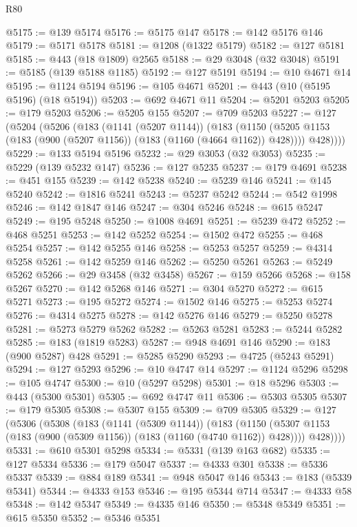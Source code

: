 \begin{lexlean}{R80}
\begin{coremodule}
@5175 := @139 @5174
@5176 := @5175 @147
@5178 := @142 @5176 @146
@5179 := @5171 @5178
@5181 := @1208 (@1322 @5179)
@5182 := @127 @5181
@5185 := @443 (@18 @1809) @2565
@5188 := @29 @3048 (@32 @3048)
@5191 := @5185 (@139 @5188 @1185)
@5192 := @127 @5191
@5194 := @10 @4671 @14
@5195 := @1124 @5194
@5196 := @105 @4671
@5201 := @443 (@10 (@5195 @5196) (@18 @5194))
@5203 := @692 @4671 @11
@5204 := @5201 @5203
@5205 := @179 @5203
@5206 := @5205 @155
@5207 := @709 @5203
@5227 := @127
    (@5204
      (@5206
        (@183
          (@1141 (@5207 @1144))
          (@183
            (@1150 (@5205 @1153 (@183 (@900 (@5207 @1156)) (@183 (@1160 (@4664 @1162)) @428))))
            @428))))
@5229 := @133 @5194 @5196
@5232 := @29 @3053 (@32 @3053)
@5235 := @5229 (@139 @5232 @147)
@5236 := @127 @5235
@5237 := @179 @4691
@5238 := @451 @155
@5239 := @142 @5238
@5240 := @5239 @146
@5241 := @145 @5240
@5242 := @1816 @5241
@5243 := @5237 @5242
@5244 := @542 @1998
@5246 := @142 @1847 @146
@5247 := @304 @5246
@5248 := @615 @5247
@5249 := @195 @5248
@5250 := @1008 @4691
@5251 := @5239 @472
@5252 := @468 @5251
@5253 := @142 @5252
@5254 := @1502 @472
@5255 := @468 @5254
@5257 := @142 @5255 @146
@5258 := @5253 @5257
@5259 := @4314 @5258
@5261 := @142 @5259 @146
@5262 := @5250 @5261
@5263 := @5249 @5262
@5266 := @29 @3458 (@32 @3458)
@5267 := @159 @5266
@5268 := @158 @5267
@5270 := @142 @5268 @146
@5271 := @304 @5270
@5272 := @615 @5271
@5273 := @195 @5272
@5274 := @1502 @146
@5275 := @5253 @5274
@5276 := @4314 @5275
@5278 := @142 @5276 @146
@5279 := @5250 @5278
@5281 := @5273 @5279 @5262
@5282 := @5263 @5281
@5283 := @5244 @5282
@5285 := @183 (@1819 @5283)
@5287 := @948 @4691 @146
@5290 := @183 (@900 @5287) @428
@5291 := @5285 @5290
@5293 := @4725 (@5243 @5291)
@5294 := @127 @5293
@5296 := @10 @4747 @14
@5297 := @1124 @5296
@5298 := @105 @4747
@5300 := @10 (@5297 @5298)
@5301 := @18 @5296
@5303 := @443 (@5300 @5301)
@5305 := @692 @4747 @11
@5306 := @5303 @5305
@5307 := @179 @5305
@5308 := @5307 @155
@5309 := @709 @5305
@5329 := @127
    (@5306
      (@5308
        (@183
          (@1141 (@5309 @1144))
          (@183
            (@1150 (@5307 @1153 (@183 (@900 (@5309 @1156)) (@183 (@1160 (@4740 @1162)) @428))))
            @428))))
@5331 := @610 @5301 @5298
@5334 := @5331 (@139 @163 @682)
@5335 := @127 @5334
@5336 := @179 @5047
@5337 := @4333 @301
@5338 := @5336 @5337
@5339 := @884 @189
@5341 := @948 @5047 @146
@5343 := @183 (@5339 @5341)
@5344 := @4333 @153
@5346 := @195 @5344 @714
@5347 := @4333 @58
@5348 := @142 @5347
@5349 := @4335 @146
@5350 := @5348 @5349
@5351 := @615 @5350
@5352 := @5346 @5351

\end{coremodule}
\end{lexlean}
